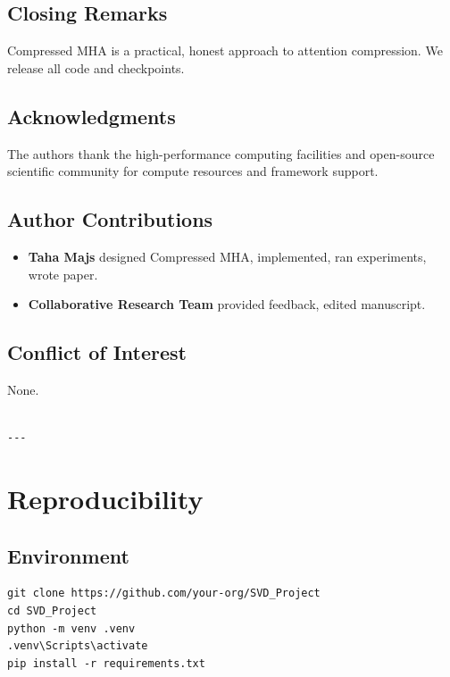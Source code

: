\subsection{Closing Remarks}

Compressed MHA is a practical, honest approach to attention compression. We 
release all code and checkpoints.

\subsection{Acknowledgments}

The authors thank the high-performance computing facilities and open-source scientific community for compute resources and framework support.

\subsection{Author Contributions}

\begin{itemize}
\item \textbf{Taha Majs} designed Compressed MHA, implemented, ran experiments,
  wrote paper.
\item \textbf{Collaborative Research Team} provided feedback, edited manuscript.

\end{itemize}
\subsection{Conflict of Interest}

None.
\begin{lstlisting}

---
\end{lstlisting}

\section{Reproducibility}

\subsection{Environment}

\begin{lstlisting}
git clone https://github.com/your-org/SVD_Project
cd SVD_Project
python -m venv .venv
.venv\Scripts\activate
pip install -r requirements.txt
\end{lstlisting}

